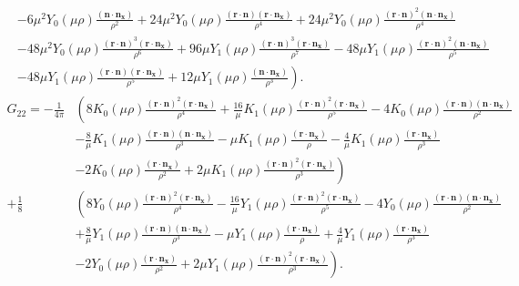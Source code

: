 \documentclass[times]{article}
\newcommand{\ndotnx}{\nn \cdot \nn_{\xx}}
\newcommand{\nn}{\mathbf{n}}
\newcommand{\rdotn}{\rr \cdot \nn}
\newcommand{\rdotnx}{\rr \cdot \nn_{\xx}}
\newcommand{\rr}{\mathbf{r}}
\newcommand{\xx}{\mathbf{x}}
\begin{document}
\begin{appendices}
\begin{align*}
  &\left.
    -6\mu^{2}Y_{0}(\mu\rho)\frac{(\ndotnx)}{\rho^{2}} 
    +24\mu^{2}Y_{0}(\mu\rho)\frac{(\rdotn)(\rdotnx)}{\rho^4}
    +24\mu^{2}Y_{0}(\mu\rho)\frac{(\rdotn)^{2}(\ndotnx)}{\rho^{4}}
  \right. \\
  &\left.
    -48\mu^{2}Y_{0}(\mu\rho)\frac{(\rdotn)^{3}(\rdotnx)}{\rho^{6}}
    +96\mu Y_{1}(\mu\rho)\frac{(\rdotn)^{3}(\rdotnx)}{\rho^{7}}
    -48\mu Y_{1}(\mu\rho)\frac{(\rdotn)^{2}(\ndotnx)}{\rho^{5}}
  \right. \\
  &\left.
    -48\mu Y_{1}(\mu\rho)\frac{(\rdotn)(\rdotnx)}{\rho^{5}}
    +12\mu Y_{1}(\mu\rho)\frac{(\ndotnx)}{\rho^{3}}
  \right).
\end{align*}
%
\begin{align*}
  G_{22} = -\frac{1}{4\pi}&\left( 
    8 K_{0}(\mu\rho)\frac{(\rdotn)^2(\rdotnx)}{\rho^{4}}
    +\frac{16}{\mu}K_{1}(\mu\rho)\frac{(\rdotn)^{2}(\rdotnx)}{\rho^{5}}
    -4K_{0}(\mu\rho)\frac{(\rdotn)(\ndotnx)}{\rho^{2}}
    \right. \\
    &\left.
    -\frac{8}{\mu}K_{1}(\mu\rho)\frac{(\rdotn)(\ndotnx)}{\rho^{3}}
    -\mu K_{1}(\mu\rho)\frac{(\rdotnx)}{\rho} 
    -\frac{4}{\mu}K_{1}(\mu\rho)\frac{(\rdotnx)}{\rho^{3}}
    \right. \\
    &\left.
    -2K_{0}(\mu\rho)\frac{(\rdotnx)}{\rho^{2}} 
    +2\mu K_{1}(\mu\rho)\frac{(\rdotn)^{2}(\rdotnx)}{\rho^{3}}
  \right) \\
  +\frac{1}{8}&\left( 
    8 Y_{0}(\mu\rho)\frac{(\rdotn)^2(\rdotnx)}{\rho^{4}}
    -\frac{16}{\mu}Y_{1}(\mu\rho)\frac{(\rdotn)^{2}(\rdotnx)}{\rho^{5}}
    -4Y_{0}(\mu\rho)\frac{(\rdotn)(\ndotnx)}{\rho^{2}}
    \right. \\
    &\left.
    +\frac{8}{\mu}Y_{1}(\mu\rho)\frac{(\rdotn)(\ndotnx)}{\rho^{3}}
    -\mu Y_{1}(\mu\rho)\frac{(\rdotnx)}{\rho} 
    +\frac{4}{\mu}Y_{1}(\mu\rho)\frac{(\rdotnx)}{\rho^{3}}
    \right. \\
    &\left.
    -2Y_{0}(\mu\rho)\frac{(\rdotnx)}{\rho^{2}} 
    +2\mu Y_{1}(\mu\rho)\frac{(\rdotn)^{2}(\rdotnx)}{\rho^{3}}
  \right).
\end{align*}
\end{appendices}

%
%
%
%
\end{document}
